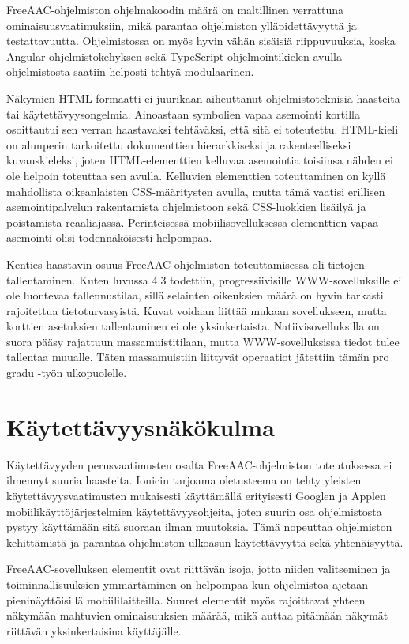 \documentclass[utf8]{gradu3}
\begin{document}
FreeAAC-ohjelmiston ohjelmakoodin määrä on maltillinen verrattuna ominaisuusvaatimuksiin, mikä parantaa ohjelmiston ylläpidettävyyttä ja testattavuutta. Ohjelmistossa on myös hyvin vähän sisäisiä riippuvuuksia, koska Angular-ohjelmistokehyksen sekä TypeScript-ohjelmointikielen avulla ohjelmistosta saatiin helposti tehtyä modulaarinen. 

Näkymien HTML-formaatti ei juurikaan aiheuttanut ohjelmistoteknisiä haasteita tai käytettävyysongelmia. Ainoastaan symbolien vapaa asemointi kortilla osoittautui sen verran haastavaksi tehtäväksi, että sitä ei toteutettu. HTML-kieli on alunperin tarkoitettu dokumenttien hierarkkiseksi ja rakenteelliseksi kuvauskieleksi, joten HTML-elementtien kelluvaa asemointia toisiinsa nähden ei ole helpoin toteuttaa sen avulla. Kelluvien elementtien toteuttaminen on kyllä mahdollista oikeanlaisten CSS-määritysten avulla, mutta tämä vaatisi erillisen asemointipalvelun rakentamista ohjelmistoon sekä CSS-luokkien lisäilyä ja poistamista reaaliajassa. Perinteisessä mobiilisovelluksessa elementtien vapaa asemointi olisi todennäköisesti helpompaa.

Kenties haastavin osuus FreeAAC-ohjelmiston toteuttamisessa oli tietojen tallentaminen. Kuten luvussa 4.3 todettiin, progressiivisille WWW-sovelluksille ei ole luontevaa tallennustilaa, sillä selainten oikeuksien määrä on hyvin tarkasti rajoitettua tietoturvasyistä. Kuvat voidaan liittää mukaan sovellukseen, mutta korttien asetuksien tallentaminen ei ole yksinkertaista. Natiivisovelluksilla on suora pääsy rajattuun massamuistitilaan, mutta WWW-sovelluksissa tiedot tulee tallentaa muualle. Täten massamuistiin liittyvät operaatiot jätettiin tämän pro gradu -työn ulkopuolelle.

\section{Käytettävyysnäkökulma}

Käytettävyyden perusvaatimusten osalta FreeAAC-ohjelmiston toteutuksessa ei ilmennyt suuria haasteita. Ionicin tarjoama oletusteema on tehty yleisten käytettävyysvaatimusten mukaisesti käyttämällä erityisesti Googlen ja Applen mobiilikäyttöjärjestelmien käytettävyysohjeita, joten suurin osa ohjelmistosta pystyy käyttämään sitä suoraan ilman muutoksia. Tämä nopeuttaa ohjelmiston kehittämistä ja parantaa ohjelmiston ulkoasun käytettävyyttä sekä yhtenäisyyttä.

FreeAAC-sovelluksen elementit ovat riittävän isoja, jotta niiden valitseminen ja toiminnallisuuksien ymmärtäminen on helpompaa kun ohjelmistoa ajetaan pieninäyttöisillä mobiililaitteilla. Suuret elementit myös rajoittavat yhteen näkymään mahtuvien ominaisuuksien määrää, mikä auttaa pitämään näkymät riittävän yksinkertaisina käyttäjälle.
\end{document}

